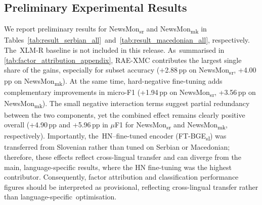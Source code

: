 \documentclass[make,article,accept,pdftex,moreauthors]{Definitions/mdpi}
\begin{document}
\subsection[\appendixname~\thesubsection]{Preliminary Experimental Results}
\label{subsec:sr_mk_results}
We report preliminary results for NewsMon\textsubscript{sr} and NewsMon\textsubscript{mk} in \mbox{Tables~\ref{tab:result_serbian_all} and \ref{tab:result_macedonian_all},} respectively. The~XLM-R baseline is not included in this release. As~summarised in \cref{tab:factor_attribution_appendix}, RAE-XMC contributes the largest single share of the gains, especially for subset accuracy (+2.88\,pp on NewsMon\textsubscript{sr}, +4.00\,pp on NewsMon\textsubscript{mk}). 
At the same time, hard-negative fine-tuning adds complementary improvements in micro-F1 (+1.94\,pp on NewsMon\textsubscript{sr}, +3.56\,pp on NewsMon\textsubscript{mk}). 
The small negative interaction terms suggest partial redundancy between the two components, yet the combined effect remains clearly positive overall (+4.90\,pp and +5.96\,pp in $\mu$F1 for NewsMon\textsubscript{sr} and NewsMon\textsubscript{mk}, respectively). 
Importantly, the~HN–fine-tuned encoder (FT-BGE\textsubscript{sl}) was transferred from Slovenian rather than tuned on Serbian or Macedonian; therefore, these effects reflect cross-lingual transfer and can diverge from the main, language-specific results, where the HN fine-tuning was the highest contributor. 
Consequently, factor attribution and classification performance figures should be interpreted as provisional, reflecting cross-lingual transfer rather than language-specific~optimisation.
\end{document}
